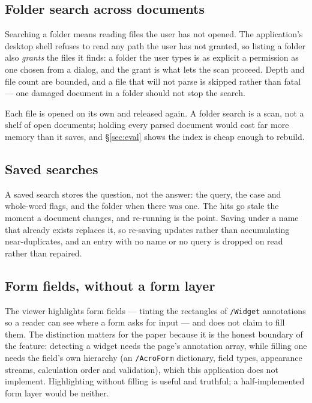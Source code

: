 \subsection{Folder search across documents}
\label{sec:folder-search}

Searching a folder means reading files the user has not opened. The application's desktop shell
refuses to read any path the user has not granted, so listing a folder also \emph{grants} the
files it finds: a folder the user types is as explicit a permission as one chosen from a
dialog, and the grant is what lets the scan proceed. Depth and file count are bounded, and a
file that will not parse is skipped rather than fatal --- one damaged document in a folder
should not stop the search.

Each file is opened on its own and released again. A folder search is a scan, not a shelf of
open documents; holding every parsed document would cost far more memory than it saves, and
\S\ref{sec:eval} shows the index is cheap enough to rebuild.

\subsection{Saved searches}

A saved search stores the question, not the answer: the query, the case and whole-word flags,
and the folder when there was one. The hits go stale the moment a document changes, and
re-running is the point. Saving under a name that already exists replaces it, so re-saving
updates rather than accumulating near-duplicates, and an entry with no name or no query is
dropped on read rather than repaired.

\subsection{Form fields, without a form layer}
\label{sec:fields}

The viewer highlights form fields --- tinting the rectangles of \texttt{/Widget} annotations so
a reader can see where a form asks for input --- and does not claim to fill them. The
distinction matters for the paper because it is the honest boundary of the feature: detecting
a widget needs the page's annotation array, while filling one needs the field's own hierarchy
(an \texttt{/AcroForm} dictionary, field types, appearance streams, calculation order and
validation), which this application does not implement. Highlighting without filling is
useful and truthful; a half-implemented form layer would be neither.
